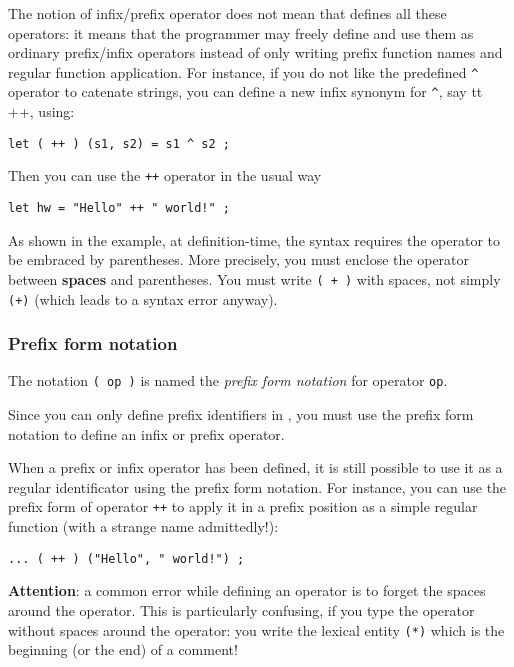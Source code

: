 The notion of infix/prefix operator does not mean that
{\focal} defines all these operators: it means that the programmer
may freely define and use them as ordinary
prefix/infix operators instead of only writing prefix function names and regular function
application. For instance, if you do not like the {\focal} predefined \verb"^"
operator to catenate strings, you can define a new infix synonym for \verb"^",
say {tt ++}, using:
{\scriptsize
\begin{lstlisting}
let ( ++ ) (s1, s2) = s1 ^ s2 ;
\end{lstlisting}
}
Then you can use the {\tt ++} operator in the usual way
{\scriptsize
\begin{lstlisting}
let hw = "Hello" ++ " world!" ;
\end{lstlisting}
}

As shown in the example, at definition-time, the syntax requires
the operator to be embraced by parentheses. More precisely, you must
enclose the operator between {\bf spaces} and parentheses.
You must write {\tt ( + )} with spaces, not simply {\tt (+)} (which leads
to a syntax error anyway).

\subsubsection{Prefix form notation}

The notation {\tt ( op )} is named the {\em prefix form notation} for
operator {\tt op}.

Since you can only define prefix identifiers in {\focal}, you must use the
prefix form notation to define an infix or prefix operator.

When a prefix or infix operator has been defined, it is still possible
to use it as a regular identificator using the prefix form notation.
For instance, you can use the prefix form of operator {\tt ++}
to apply it in a prefix position as a simple regular function (with a
strange name admittedly!):

{\scriptsize
\begin{lstlisting}
... ( ++ ) ("Hello", " world!") ;
\end{lstlisting}
}

{\bf Attention}: a common error while defining an operator is to forget
the spaces around the operator. This is particularly confusing, if you
type the {\tt *} operator without spaces around the operator: you
write the lexical entity {\tt (*)} which is the beginning (or the end)
of a comment!

